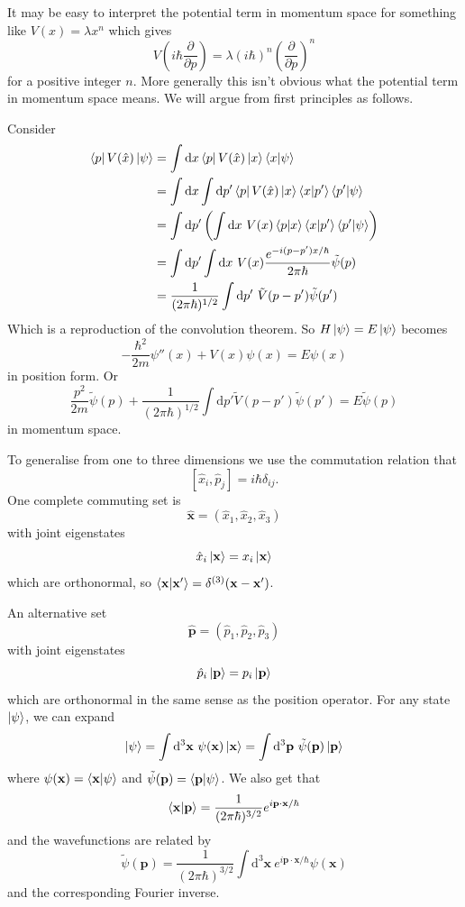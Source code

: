 \documentclass{article}
\begin{document}
It may  be easy to interpret the potential term in momentum space for something like $ V(x) = \lambda x^n $ which gives
\[
	V\left(i\hbar \frac{\partial}{\partial p}\right) = \lambda(i\hbar)^n\left(\frac\partial{\partial p}\right)^n
\]
for a positive integer $ n $. More generally this isn't obvious what the potential term in momentum space means. We will argue from first principles as follows.\par
Consider
\begin{align*}
	\bra{p} V(\hat x) \ket{\psi} &= \int\mathrm dx\bra p V(\hat x) \ket x \bra{x}\ket{\psi} \\
				     &= \int\mathrm dx \int\mathrm dp'\bra p V(\hat x) \ket x \bra{x}\ket{p'} \bra{p'}\ket{\psi} \\
				     &= \int\mathrm dp'\left(\int\mathrm dx \ V(x)\bra{p}\ket{x} \bra{x}\ket{p'}\bra{p'}\ket{\psi}\right) \\
				     &= \int\mathrm dp'\int\mathrm dx \ V(x) \frac{e^{-i(p-p')x/\hbar}}{2\pi \hbar} \tilde \psi(p) \\
				     &= \frac 1{(2\pi \hbar)^{1/2}}\int\mathrm dp'\ \tilde V(p-p')\tilde \psi(p')
\end{align*}
Which is a reproduction of the convolution theorem. So $ H\ket \psi = E \ket \psi $ becomes
\[
	-\frac{\hbar^2}{2m} \psi''(x) + V(x)\psi(x) =E\psi(x)
\]
in position form. Or
\[
	\frac{p^2}{2m}\tilde \psi(p) + \frac 1{(2\pi\hbar)^{1/2}} \int\mathrm dp'\tilde V(p-p') \tilde \psi(p') = E\tilde \psi(p)
\]
in momentum space.\par
To generalise from one to three dimensions we use the commutation relation that
\[
	[\hat x_i, \hat p_j] = i\hbar \delta_{ij}.
\]
One complete commuting set is
\[
	\hat{\mathbf x} = (\hat x_1, \hat x_2, \hat x_3)
\]
with joint eigenstates
\[
	\hat x_i\ket{\mathbf x} = x_i\ket{\mathbf x}
\]
which are orthonormal, so $ \bra{\mathbf x}\ket{\mathbf x'} = \delta^{(3)}(\mathbf x- \mathbf x') $. \par
An alternative set
\[
	\hat{\mathbf p} = (\hat p_1, \hat p_2,\hat p_3)
\]
with joint eigenstates
\[
	\hat p_i \ket{\mathbf p} = p_i\ket{\mathbf p}
\]
which are orthonormal in the same sense as the position operator. For any state $ \ket \psi $, we can expand
\begin{align*}
	\ket \psi = \int \mathrm d^3 \mathbf x\ \psi(\mathbf x)\ket{\mathbf x} = \int\mathrm d^3 \mathbf p\ \tilde \psi(\mathbf p)\ket{\mathbf p}
\end{align*}
where $ \psi(\mathbf x)=\bra{\mathbf{x}}\ket{\psi} $ and $ \tilde \psi(\mathbf p) = \bra{\mathbf p} \ket{\psi}$. We also get that
\[
\bra{\mathbf{x}}\ket{\mathbf p} = \frac 1{(2\pi\hbar)^{3/2}} e^{i\mathbf p \cdot\mathbf x/\hbar}
\]
and the wavefunctions are related by
\[
	\tilde \psi(\mathbf p) = \frac 1{(2\pi \hbar)^{3/2}} \int \mathrm d^3 \mathbf x \ e^{i\mathbf p \cdot\mathbf x/\hbar} \psi(\mathbf x)
\]
and the corresponding Fourier inverse.
\end{document}
